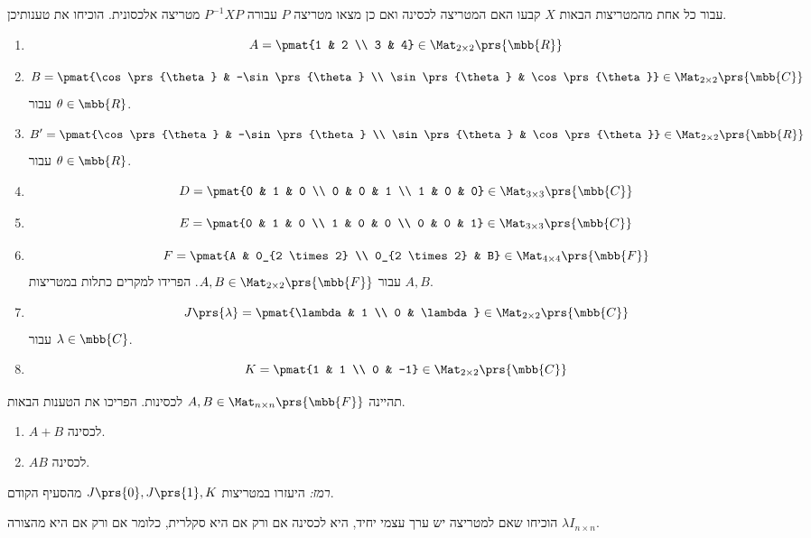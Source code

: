 \documentclass[a4paper,10pt,twoside,openany]{article}
\begin{document}
\begin{exercise}
עבור כל אחת מהמטריצות הבאות $X$ קבעו האם המטריצה לכסינה ואם כן מצאו מטריצה
$P$
עבורה
$P^{-1} X P$
מטריצה אלכסונית.
הוכיחו את טענותיכן.

\begin{enumerate}
\item \[A = \pmat{1 & 2 \\ 3 & 4} \in \Mat_{2 \times 2}\prs{\mbb{R}}\]
\item \[B = \pmat{\cos\prs{\theta} & -\sin\prs{\theta} \\ \sin\prs{\theta} & \cos\prs{\theta}} \in \Mat_{2 \times 2}\prs{\mbb{C}}\]
עבור
$\theta \in \mbb{R}$.
\item \[B' = \pmat{\cos\prs{\theta} & -\sin\prs{\theta} \\ \sin\prs{\theta} & \cos\prs{\theta}} \in \Mat_{2 \times 2}\prs{\mbb{R}}\]
עבור
$\theta \in \mbb{R}$.
\item \[D = \pmat{0 & 1 & 0 \\ 0 & 0 & 1 \\ 1 & 0 & 0} \in \Mat_{3 \times 3}\prs{\mbb{C}}\]
\item \[E = \pmat{0 & 1 & 0 \\ 1 & 0 & 0 \\ 0 & 0 & 1} \in \Mat_{3 \times 3}\prs{\mbb{C}}\]
\item \[F = \pmat{A & 0_{2 \times 2} \\ 0_{2 \times 2} & B} \in \Mat_{4 \times 4}\prs{\mbb{F}}\]
עבור
$A,B \in \Mat_{2 \times 2}\prs{\mbb{F}}$.
הפרידו למקרים כתלות במטריצות
$A,B$.
\item \[J\prs{\lambda} = \pmat{\lambda & 1 \\ 0 & \lambda} \in \Mat_{2 \times 2}\prs{\mbb{C}}\]
עבור
$\lambda \in \mbb{C}$.
\item \[K = \pmat{1 & 1 \\ 0 & -1} \in \Mat_{2 \times 2}\prs{\mbb{C}}\]
\end{enumerate}
\end{exercise}

\begin{exercise}
תהיינה
$A,B \in \Mat_{n \times n}\prs{\mbb{F}}$
לכסינות. הפריכו את הטענות הבאות.
\begin{enumerate}
\item $A+B$ לכסינה.
\item $AB$ לכסינה.
\end{enumerate}
\emph{רמז:}
היעזרו במטריצות
$J\prs{0}, J\prs{1}, K$
מהסעיף הקודם.
\end{exercise}

\begin{exercise}
הוכיחו שאם למטריצה יש ערך עצמי יחיד, היא לכסינה אם ורק אם היא סקלרית, כלומר אם ורק אם היא מהצורה
$\lambda I_{n \times n}$.
\end{exercise}
\end{document}
